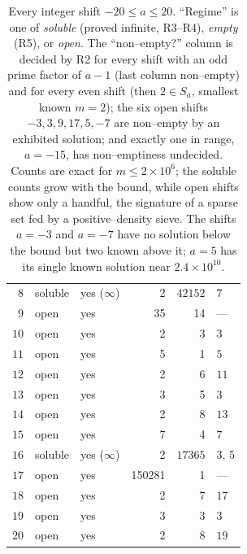 \documentclass[a4paper]{article}
\theoremstyle{plain}
\theoremstyle{definition}
\theoremstyle{remark}
\newcommand{\Sa}{S_a}
\begin{document}
\begin{table}[H]
\begin{tabular}{r l l r r l}
$8$ & soluble & yes ($\infty$) & 2 & $42152$ & $7$ \\
$9$ & open & yes & 35 & 14 & --- \\
$10$ & open & yes & 2 & 3 & $3$ \\
$11$ & open & yes & 5 & 1 & $5$ \\
$12$ & open & yes & 2 & 6 & $11$ \\
$13$ & open & yes & 3 & 5 & $3$ \\
$14$ & open & yes & 2 & 8 & $13$ \\
$15$ & open & yes & 7 & 4 & $7$ \\
$16$ & soluble & yes ($\infty$) & 2 & $17365$ & $3,\,5$ \\
$17$ & open & yes & 150281 & 1 & --- \\
$18$ & open & yes & 2 & 7 & $17$ \\
$19$ & open & yes & 3 & 3 & $3$ \\
$20$ & open & yes & 2 & 8 & $19$ \\
\bottomrule
\end{tabular}
\caption{Every integer shift $-20\le a\le20$. ``Regime'' is one of \emph{soluble} (proved infinite, R3--R4), \emph{empty} (R5), or \emph{open}. The ``non--empty?'' column is decided by R2 for every shift with an odd prime factor of $a-1$ (last column non--empty) and for every even shift (then $2\in\Sa$, smallest known $m=2$); the six open shifts $-3,3,9,17,5,-7$ are non--empty by an exhibited solution; and exactly one in range, $a=-15$, has non--emptiness undecided. Counts are exact for $m\le2\times10^{6}$; the soluble counts grow with the bound, while open shifts show only a handful, the signature of a sparse set fed by a positive--density sieve. The shifts $a=-3$ and $a=-7$ have no solution below the bound but two known above it; $a=5$ has its single known solution near $2.4\times10^{10}$.}
\label{d2:tab:full}
\end{table}

\medskip
\end{document}
